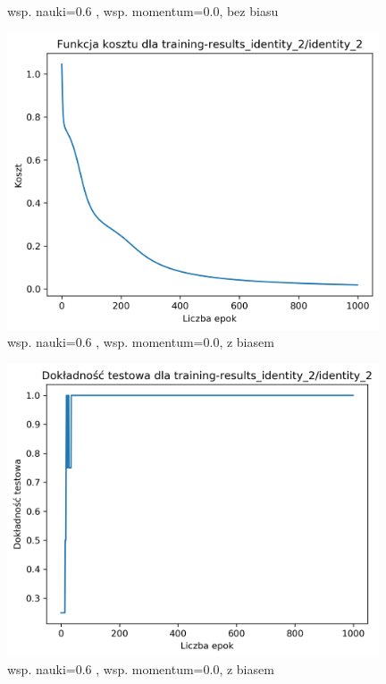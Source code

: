 \documentclass{classrep}
\begin{document}
{{\begin{figure}[!htbp]
                \caption{wsp. nauki=0.6 , wsp. momentum=0.0, bez biasu}
            \end{figure}
            \FloatBarrier
            \begin{figure}[!htbp]
                \centering
                \includegraphics[width=110mm]{wykresy/identity_2_cost.png}
                \caption{wsp. nauki=0.6 , wsp. momentum=0.0, z biasem}
            \end{figure}
            \begin{figure}[!htbp]
                \centering
                \includegraphics[width=110mm]{wykresy/identity_2_testing-accuracy.png}
                \caption{wsp. nauki=0.6 , wsp. momentum=0.0, z biasem}
            \end{figure}
            \FloatBarrier
            \begin{figure}[!htbp]

\end{figure}}}
\end{document}
